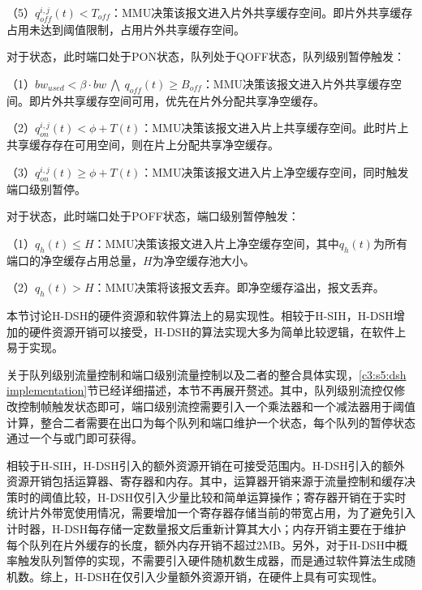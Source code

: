 （5）$q^{i,j}_{off}(t) < T_{off}$：MMU决策该报文进入片外共享缓存空间。即片外共享缓存占用未达到阈值限制，占用片外共享缓存空间。

对于状态，此时端口处于PON状态，队列处于QOFF状态，队列级别暂停触发：

\setcounter{paragraph}{0}

（1）$bw_{used} < \beta \cdot bw ~\bigwedge ~q_{off}(t) \geqslant B_{off}$：MMU决策该报文进入片外共享缓存空间。即片外共享缓存空间可用，优先在片外分配共享净空缓存。

（2）$q_{on}^{i,j}(t)< \phi+T(t)$：MMU决策该报文进入片上共享缓存空间。此时片上共享缓存存在可用空间，则在片上分配共享净空缓存。

（3）$q_{on}^{i,j}(t) \geqslant \phi+T(t)$：MMU决策该报文进入片上净空缓存空间，同时触发端口级别暂停。

对于状态，此时端口处于POFF状态，端口级别暂停触发：

\setcounter{paragraph}{0}

（1）$q_{h}(t) \leqslant H$：MMU决策该报文进入片上净空缓存空间，其中$q_{h}(t)$为所有端口的净空缓存占用总量，$H$为净空缓存池大小。

（2）$q_{h}(t) > H$：MMU决策将该报文丢弃。即净空缓存溢出，报文丢弃。


\label{c4:s4:hdsh implementation}

本节讨论H-DSH的硬件资源和软件算法上的易实现性。相较于H-SIH，H-DSH增加的硬件资源开销可以接受，H-DSH的算法实现大多为简单比较逻辑，在软件上易于实现。



关于队列级别流量控制和端口级别流量控制以及二者的整合具体实现，\ref{c3:s5:dsh implementation}节已经详细描述，本节不再展开赘述。其中，队列级别流控仅修改控制帧触发状态即可，端口级别流控需要引入一个乘法器和一个减法器用于阈值计算，整合二者需要在出口为每个队列和端口维护一个状态，每个队列的暂停状态通过一个与或门即可获得。



相较于H-SIH，H-DSH引入的额外资源开销在可接受范围内。H-DSH引入的额外资源开销包括运算器、寄存器和内存。其中，运算器开销来源于流量控制和缓存决策时的阈值比较，H-DSH仅引入少量比较和简单运算操作；寄存器开销在于实时统计片外带宽使用情况，需要增加一个寄存器存储当前的带宽占用，为了避免引入计时器，H-DSH每存储一定数量报文后重新计算其大小；内存开销主要在于维护每个队列在片外缓存的长度，额外内存开销不超过2MB。另外，对于H-DSH中概率触发队列暂停的实现，不需要引入硬件随机数生成器，而是通过软件算法生成随机数。综上，H-DSH在仅引入少量额外资源开销，在硬件上具有可实现性。

